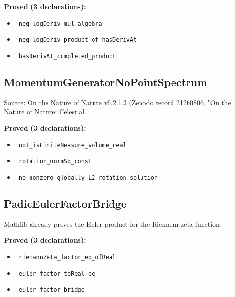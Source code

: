 \documentclass{report}
\theoremstyle{definition}
\begin{document}
\noindent\textbf{Proved (3 declarations):}
\begin{itemize}
  \item {}\leanok\ \texttt{neg\_logDeriv\_mul\_algebra}
  \item {}\leanok\ \texttt{neg\_logDeriv\_product\_of\_hasDerivAt}
  \item {}\leanok\ \texttt{hasDerivAt\_completed\_product}
\end{itemize}

\subsection{MomentumGeneratorNoPointSpectrum}
Source: On the Nature of Nature v5.2.1.3 (Zenodo record 21260806, "On the Nature of Nature: Celestial

\noindent\textbf{Proved (3 declarations):}
\begin{itemize}
  \item {}\leanok\ \texttt{not\_isFiniteMeasure\_volume\_real}
  \item {}\leanok\ \texttt{rotation\_normSq\_const}
  \item {}\leanok\ \texttt{no\_nonzero\_globally\_L2\_rotation\_solution}
\end{itemize}

\subsection{PadicEulerFactorBridge}
Mathlib already proves the Euler product for the Riemann zeta function:

\noindent\textbf{Proved (3 declarations):}
\begin{itemize}
  \item {}\leanok\ \texttt{riemannZeta\_factor\_eq\_ofReal}
  \item {}\leanok\ \texttt{euler\_factor\_toReal\_eq}
  \item {}\leanok\ \texttt{euler\_factor\_bridge}
\end{itemize}
\end{document}
